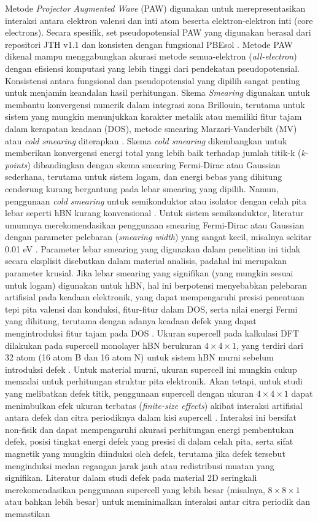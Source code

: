 Metode \textit{Projector Augmented Wave} (PAW) \citep{Blochl1994, Kresse1999} digunakan untuk merepresentasikan interaksi antara elektron valensi dan inti atom beserta elektron-elektron inti (core electrons). Secara spesifik, set pseudopotensial PAW yang digunakan berasal dari repositori JTH v1.1 dan konsisten dengan fungsional PBEsol . Metode PAW dikenal mampu menggabungkan akurasi metode semua-elektron (\textit{all-electron}) dengan efisiensi komputasi yang lebih tinggi dari pendekatan pseudopotensial. Konsistensi antara fungsional dan pseudopotensial yang dipilih sangat penting untuk menjamin keandalan hasil perhitungan. Skema \textit{Smearing} digunakan untuk membantu konvergensi numerik dalam integrasi zona Brillouin, terutama untuk sistem yang mungkin menunjukkan karakter metalik atau memiliki fitur tajam dalam kerapatan keadaan (DOS), metode smearing Marzari-Vanderbilt (MV) atau \textit{cold smearing} \citep{Marzari1999} diterapkan . Skema \textit{cold smearing} dikembangkan untuk memberikan konvergensi energi total yang lebih baik terhadap jumlah titik-k (\textit{k-points}) dibandingkan dengan skema smearing Fermi-Dirac atau Gaussian sederhana, terutama untuk sistem logam, dan energi bebas yang dihitung cenderung kurang bergantung pada lebar smearing yang dipilih. Namun, penggunaan \textit{cold smearing} untuk semikonduktor atau isolator dengan celah pita lebar seperti hBN kurang konvensional . Untuk sistem semikonduktor, literatur umumnya merekomendasikan penggunaan smearing Fermi-Dirac atau Gaussian dengan parameter pelebaran (\textit{smearing width}) yang sangat kecil, misalnya sekitar 0.01 eV . Parameter lebar smearing yang digunakan dalam penelitian ini tidak secara eksplisit disebutkan dalam material analisis, padahal ini merupakan parameter krusial. Jika lebar smearing yang signifikan (yang mungkin sesuai untuk logam) digunakan untuk hBN, hal ini berpotensi menyebabkan pelebaran artifisial pada keadaan elektronik, yang dapat mempengaruhi presisi penentuan tepi pita valensi dan konduksi, fitur-fitur dalam DOS, serta nilai energi Fermi yang dihitung, terutama dengan adanya keadaan defek yang dapat mengintroduksi fitur tajam pada DOS . Ukuran supercell pada kalkulasi DFT dilakukan pada supercell monolayer hBN berukuran $4 \times 4 \times 1$, yang terdiri dari 32 atom (16 atom B dan 16 atom N) untuk sistem hBN murni sebelum introduksi defek . Untuk material murni, ukuran supercell ini mungkin cukup memadai untuk perhitungan struktur pita elektronik. Akan tetapi, untuk studi yang melibatkan defek titik, penggunaan supercell dengan ukuran $4 \times 4 \times 1$ dapat menimbulkan efek ukuran terbatas (\textit{finite-size effects}) akibat interaksi artifisial antara defek dan citra periodiknya dalam kisi supercell . Interaksi ini bersifat non-fisik dan dapat mempengaruhi akurasi perhitungan energi pembentukan defek, posisi tingkat energi defek yang presisi di dalam celah pita, serta sifat magnetik yang mungkin diinduksi oleh defek, terutama jika defek tersebut menginduksi medan regangan jarak jauh atau redistribusi muatan yang signifikan. Literatur dalam studi defek pada material 2D seringkali merekomendasikan penggunaan supercell yang lebih besar (misalnya, $8 \times 8 \times 1$ atau bahkan lebih besar) untuk meminimalkan interaksi antar citra periodik dan memastikan 